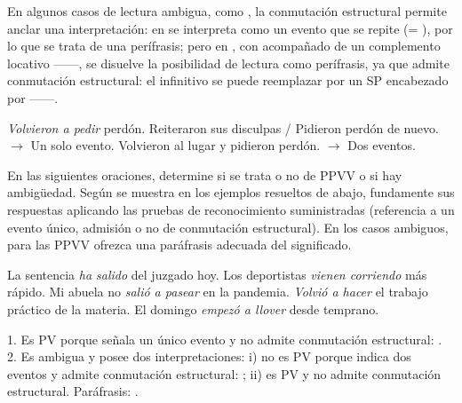 En algunos casos de lectura ambigua, como , la conmutación
estructural permite anclar una interpretación: en  se
interpreta  como un evento que se repite (=
), por lo que se trata de una perífrasis; pero en
, con  acompañado de un complemento locativo
------, se disuelve la posibilidad de lectura como
perífrasis, ya que admite conmutación estructural: el infinitivo se puede
reemplazar por un SP encabezado por  ------.

\begin{exe}
  \ex
    \begin{xlist}
      \ex\label{ex:11-perdon-a} \textit{Volvieron a pedir} perdón.
      \ex\label{ex:11-perdon-b} Reiteraron sus disculpas / Pidieron perdón de
          nuevo. $\rightarrow$ Un solo evento.
      \ex\label{ex:11-perdon-c} Volvieron al lugar y pidieron perdón.
          $\rightarrow$ Dos eventos.
    \end{xlist}
\end{exe}

\begin{ejercicio}\label{ej:11-reconocer}
En las siguientes oraciones, determine si se trata o no de PPVV o si hay
ambigüedad. Según se muestra en los ejemplos resueltos de abajo, fundamente sus
respuestas aplicando las pruebas de reconocimiento suministradas (referencia a
un evento único, admisión o no de conmutación estructural). En los casos
ambiguos, para las PPVV ofrezca una paráfrasis adecuada del significado.

\begin{exe}
  \ex La sentencia \textit{ha salido} del juzgado hoy.
  \ex Los deportistas \textit{vienen corriendo} más rápido.
  \ex Mi abuela no \textit{salió a pasear} en la pandemia.
  \ex \textit{Volvió a hacer} el trabajo práctico de la materia.
  \ex El domingo \textit{empezó a llover} desde temprano.
\end{exe}

\begin{resuelto}
1. Es PV porque señala un único evento y no admite conmutación estructural:
. 2. Es ambigua y
posee dos interpretaciones: i) no es PV porque indica dos eventos y admite
conmutación estructural: ; ii) es PV y no admite conmutación estructural.
Paráfrasis: .
\end{resuelto}
\end{ejercicio}

